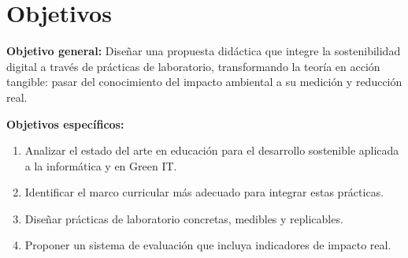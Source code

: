 \chapter{Objetivos}
\label{cap:objetivos}

\textbf{Objetivo general:} Diseñar una propuesta didáctica que integre la sostenibilidad digital a través de prácticas de laboratorio, transformando la teoría en acción tangible: pasar del conocimiento del impacto ambiental a su medición y reducción real.

\vspace{0.4cm}
\textbf{Objetivos específicos:}

\begin{enumerate}
\item Analizar el estado del arte en educación para el desarrollo sostenible aplicada a la informática y en Green IT.
\item Identificar el marco curricular más adecuado para integrar estas prácticas.
\item Diseñar prácticas de laboratorio concretas, medibles y replicables.
\item Proponer un sistema de evaluación que incluya indicadores de impacto real.
\end{enumerate}
